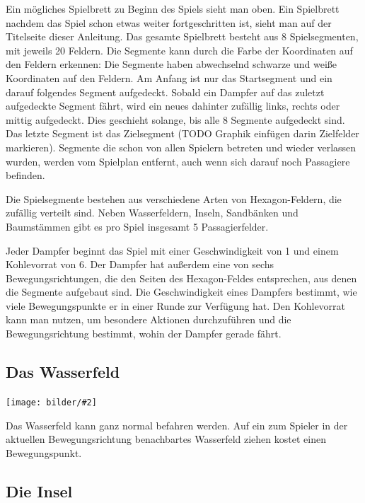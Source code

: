 \documentclass[12pt,a4paper, ngerman, oneside]{scrartcl}
\def\Tiles/{8}
\def\FieldsPerTile/{20}
\def\Passagiere/{5}
\newcommand{\fieldGraphic}[2]{%
\begin{floatingfigure}[#1]{0.15\textwidth}%
  \centering
  \texttt{[image: bilder/\#2]}%
\end{floatingfigure}%
}
\begin{document}
Ein mögliches Spielbrett zu Beginn des Spiels sieht man oben. Ein Spielbrett
nachdem das Spiel schon etwas weiter fortgeschritten ist, sieht man auf der
Titelseite dieser Anleitung. Das gesamte Spielbrett besteht aus \Tiles/
Spielsegmenten, mit jeweils \FieldsPerTile/ Feldern. Die Segmente kann durch die
Farbe der Koordinaten auf den Feldern erkennen: Die Segmente haben abwechselnd
schwarze und weiße Koordinaten auf den Feldern. Am Anfang ist nur das
Startsegment und ein darauf folgendes Segment aufgedeckt. Sobald ein Dampfer auf
das zuletzt aufgedeckte Segment fährt, wird ein neues dahinter zufällig links,
rechts oder mittig aufgedeckt. Dies geschieht solange, bis alle \Tiles/ Segmente
aufgedeckt sind. Das letzte Segment ist das Zielsegment (TODO Graphik einfügen
darin Zielfelder markieren). Segmente die schon von allen Spielern betreten und
wieder verlassen wurden, werden vom Spielplan entfernt, auch wenn sich darauf
noch Passagiere befinden.

Die Spielsegmente bestehen aus verschiedene Arten von Hexagon-Feldern, die
zufällig verteilt sind. Neben Wasserfeldern, Inseln, Sandbänken und Baumstämmen
gibt es pro Spiel insgesamt \Passagiere/ Passagierfelder.

Jeder Dampfer beginnt das Spiel mit einer Geschwindigkeit von 1 und einem
Kohlevorrat von 6. Der Dampfer hat außerdem eine von sechs Bewegungsrichtungen,
die den Seiten des Hexagon-Feldes entsprechen, aus denen die Segmente aufgebaut
sind. Die Geschwindigkeit eines Dampfers bestimmt, wie viele Bewegungspunkte er
in einer Runde zur Verfügung hat. Den Kohlevorrat kann man nutzen, um besondere
Aktionen durchzuführen und die Bewegungsrichtung bestimmt, wohin der Dampfer
gerade fährt.

\subsection{\label{water}Das Wasserfeld}

\fieldGraphic{r}{wasser}

Das Wasserfeld kann ganz normal befahren werden. Auf ein zum Spieler in der
aktuellen Bewegungsrichtung benachbartes Wasserfeld ziehen kostet einen
Bewegungspunkt.

\paragraph{}

\subsection{\label{island}Die Insel}
\end{document}
